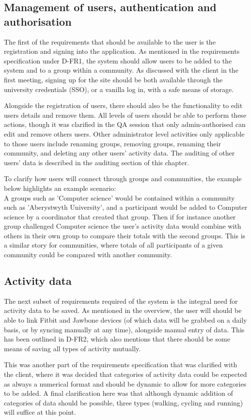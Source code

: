 \subsection{Management of users, authentication and authorisation}
The first of the requirements that should be available to the user is the registration and signing into the application. As mentioned in the requirements specification under D-FR1, the system should allow users to be added to the system and to a group within a community. As discussed with the client in the first meeting, signing up for the site should be both available through the university credentials (SSO), or a vanilla log in, with a safe means of storage. \par
Alongside the registration of users, there should also be the functionality to edit users details and remove them. All levels of users should be able to perform these actions, though it was clarified in the QA session that only admin-authorised can edit and remove others users. Other administrator level activities only applicable to those users include renaming groups, removing groups, renaming their community, and deleting any other users' activity data. The auditing of other users' data is described in the auditing section of this chapter. \par
To clarify how users will connect through groups and communities, the example below highlights an example scenario:\\
A groups such as 'Computer science' would be contained within a community such as 'Aberystwyth University', and a participant would be added to Computer science by a coordinator that created that group. Then if for instance another group challenged Computer science the user's activity data would combine with others in their own group to compare their totals with the second groups. This is a similar story for communities, where totals of all participants of a given community could be compared with another community.
\subsection{Activity data}
The next subset of requirements required of the system is the integral need for activity data to be saved. As mentioned in the overview, the user will should be able to link Fitbit and Jawbone devices (of which data will be grabbed on a daily basis, or by syncing manually at any time), alongside manual entry of data. This has been outlined in D-FR2, which also mentions that there should be some means of saving all types of activity mutually. \par
This was another part of the requirements specification that was clarified with the client, where it was decided that categories of activity data could be expected as always a numerical format and should be dynamic to allow for more categories to be added. A final clarification here was that although dynamic addition of categories of data should be possible, three types (walking, cycling and running) will suffice at this point.

